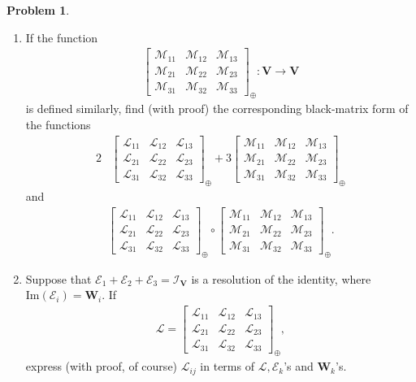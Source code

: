 \documentclass{article}
\theoremstyle{definition}
\newtheorem*{prob*}{Problem}
\newcommand{\V}{\mathbf{V}}
\newcommand{\W}{\mathbf{W}}
\newcommand{\lag}{\mathcal{L}}
\newcommand{\M}{\mathcal{M}}
\newcommand{\ima}{\text{Im}}
\begin{document}
\begin{prob*}
\begin{enumerate}
		
		
		\item If the function 
		\begin{align*}
		\begin{bmatrix}
		\M_{11} & \M_{12} & \M_{13}\\
		\M_{21} & \M_{22} & \M_{23}\\
		\M_{31} & \M_{32} & \M_{33}
		\end{bmatrix}_\oplus : \V \longrightarrow \V
		\end{align*}
		is defined similarly, find (with proof) the corresponding black-matrix form of the functions 
		\begin{align*}
		2&\begin{bmatrix}
		\lag_{11} & \lag_{12} & \lag_{13}\\
		\lag_{21} & \lag_{22} & \lag_{23}\\
		\lag_{31} & \lag_{32} & \lag_{33}
		\end{bmatrix}_\oplus
		+ 
		3\begin{bmatrix}
		\M_{11} & \M_{12} & \M_{13}\\
		\M_{21} & \M_{22} & \M_{23}\\
		\M_{31} & \M_{32} & \M_{33}
		\end{bmatrix}_\oplus 
		\end{align*}
		and
		\begin{align*}
		\begin{bmatrix}
		\lag_{11} & \lag_{12} & \lag_{13}\\
		\lag_{21} & \lag_{22} & \lag_{23}\\
		\lag_{31} & \lag_{32} & \lag_{33}
		\end{bmatrix}_\oplus
		\circ 
		\begin{bmatrix}
		\M_{11} & \M_{12} & \M_{13}\\
		\M_{21} & \M_{22} & \M_{23}\\
		\M_{31} & \M_{32} & \M_{33}
		\end{bmatrix}_\oplus.
		\end{align*}

		
		
		\item Suppose that $\mathcal{E}_1 + \mathcal{E}_2 + \mathcal{E}_3 = \mathcal{I}_\V$ is a resolution of the identity, where $\ima(\mathcal{E}_i) = \W_i$. If
		\begin{align*}
		\lag = \begin{bmatrix}
		\lag_{11} & \lag_{12} & \lag_{13}\\
		\lag_{21} & \lag_{22} & \lag_{23}\\
		\lag_{31} & \lag_{32} & \lag_{33}
		\end{bmatrix}_\oplus,
		\end{align*}
		express (with proof, of course) $\lag_{ij}$ in terms of $\lag, \mathcal{E}_k$'s and $\W_k$'s.
		

\end{enumerate}
\end{prob*}
\end{document}
